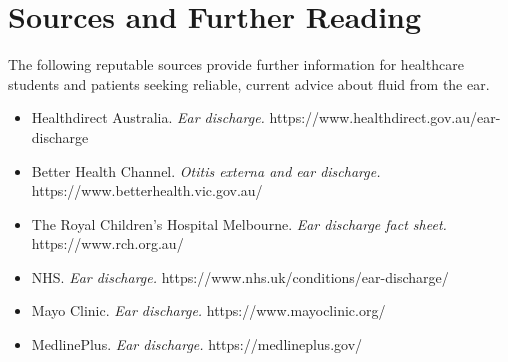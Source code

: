 \section*{Sources and Further Reading}
The following reputable sources provide further information for healthcare students and patients seeking reliable, current advice about fluid from the ear.
\begin{itemize}
    \item Healthdirect Australia. \textit{Ear discharge.} https://www.healthdirect.gov.au/ear-discharge
    \item Better Health Channel. \textit{Otitis externa and ear discharge.} https://www.betterhealth.vic.gov.au/
    \item The Royal Children's Hospital Melbourne. \textit{Ear discharge fact sheet.} https://www.rch.org.au/
    \item NHS. \textit{Ear discharge.} https://www.nhs.uk/conditions/ear-discharge/
    \item Mayo Clinic. \textit{Ear discharge.} https://www.mayoclinic.org/
    \item MedlinePlus. \textit{Ear discharge.} https://medlineplus.gov/
\end{itemize}
